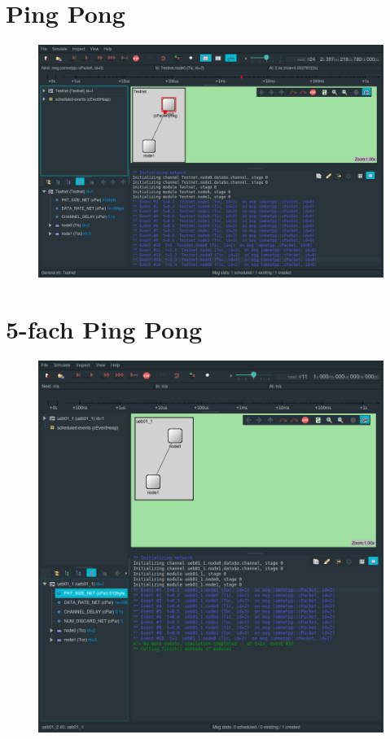 \documentclass[]{scrartcl}
\begin{document}
\section{Ping Pong}
\begin{figure}[ht]
    \centering
    \includegraphics[width=\columnwidth]{ueb01-1.png}
\end{figure}
\newpage
\section{5-fach Ping Pong}
\begin{figure}[ht]
    \centering
    \includegraphics[width=\columnwidth]{ueb01-2.png}
\end{figure}
\newpage
\end{document}
